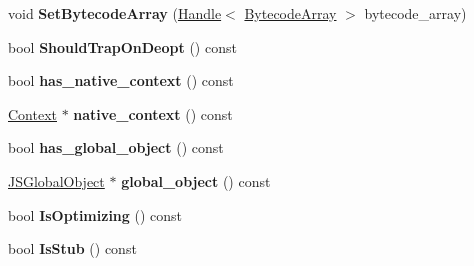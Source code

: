 \begin{DoxyCompactItemize}
\item 
void {\bfseries Set\+Bytecode\+Array} (\hyperlink{classv8_1_1internal_1_1_handle}{Handle}$<$ \hyperlink{classv8_1_1internal_1_1_bytecode_array}{Bytecode\+Array} $>$ bytecode\+\_\+array)\hypertarget{classv8_1_1internal_1_1_compilation_info_ad21f4a359540d32ba4ea9fd06fe306bd}{}\label{classv8_1_1internal_1_1_compilation_info_ad21f4a359540d32ba4ea9fd06fe306bd}

\item 
bool {\bfseries Should\+Trap\+On\+Deopt} () const \hypertarget{classv8_1_1internal_1_1_compilation_info_adafe18d28ae75ae7dd20396156ba4b12}{}\label{classv8_1_1internal_1_1_compilation_info_adafe18d28ae75ae7dd20396156ba4b12}

\item 
bool {\bfseries has\+\_\+native\+\_\+context} () const \hypertarget{classv8_1_1internal_1_1_compilation_info_ac05cd47a09010a5f401e312d87a5a6c0}{}\label{classv8_1_1internal_1_1_compilation_info_ac05cd47a09010a5f401e312d87a5a6c0}

\item 
\hyperlink{classv8_1_1internal_1_1_context}{Context} $\ast$ {\bfseries native\+\_\+context} () const \hypertarget{classv8_1_1internal_1_1_compilation_info_a85c17fefa54d84fe10b1a1edad3ba45f}{}\label{classv8_1_1internal_1_1_compilation_info_a85c17fefa54d84fe10b1a1edad3ba45f}

\item 
bool {\bfseries has\+\_\+global\+\_\+object} () const \hypertarget{classv8_1_1internal_1_1_compilation_info_a1da53a21b6f2882b45633fd06f364c89}{}\label{classv8_1_1internal_1_1_compilation_info_a1da53a21b6f2882b45633fd06f364c89}

\item 
\hyperlink{classv8_1_1internal_1_1_j_s_global_object}{J\+S\+Global\+Object} $\ast$ {\bfseries global\+\_\+object} () const \hypertarget{classv8_1_1internal_1_1_compilation_info_a810fbc9dadde8442c9a9dace02efc9d2}{}\label{classv8_1_1internal_1_1_compilation_info_a810fbc9dadde8442c9a9dace02efc9d2}

\item 
bool {\bfseries Is\+Optimizing} () const \hypertarget{classv8_1_1internal_1_1_compilation_info_adc73261da340781b8b628ee26ed3bcb3}{}\label{classv8_1_1internal_1_1_compilation_info_adc73261da340781b8b628ee26ed3bcb3}

\item 
bool {\bfseries Is\+Stub} () const \hypertarget{classv8_1_1internal_1_1_compilation_info_a82cef8b697accb2cd81e2ec5402c5855}{}\label{classv8_1_1internal_1_1_compilation_info_a82cef8b697accb2cd81e2ec5402c5855}


\end{DoxyCompactItemize}
